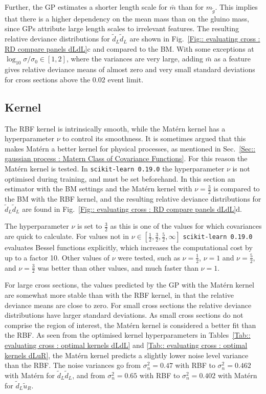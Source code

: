 \documentclass[twoside,english]{uiofysmaster}
\begin{document}
{{Further, the GP estimates a shorter length scale for $\bar{m}$ than for $m_{\widetilde{g}}$. This implies that there is a higher dependency on the mean mass than on the gluino mass, since GPs attribute large length scales to irrelevant features. The resulting relative deviance distributions for $\widetilde{d}_L \widetilde{d}_L$ are shown in Fig.~\ref{Fig:: evaluating cross : RD compare panels dLdL}c and compared to the BM. With some exceptions at $\log_{10} \sigma/\sigma_0 \in [1,2]$, where the variances are very large, adding $\bar{m}$ as a feature gives relative deviance means of almost zero and very small standard deviations for cross sections above the $0.02$ event limit. 

\subsection{Kernel}

The RBF kernel is intrinsically smooth, while the Mat\'{e}rn kernel has a hyperparameter $\nu$ to control its smoothness. It is sometimes argued that this makes Mat\'{e}rn a better kernel for physical processes, as mentioned in Sec.~\ref{Sec:: gaussian process : Matern Class of Covariance Functions}. For this reason the Mat\'{e}rn kernel is tested. In \verb|scikit-learn 0.19.0| the hyperparameter $\nu$ is not optimised during training, and must be set beforehand. In this section an estimator with the BM settings and the Mat\'{e}rn kernel with $\nu=\frac{3}{2}$ is compared to the BM with the RBF kernel, and the resulting relative deviance distributions for $\widetilde{d}_L \widetilde{d}_L$ are found in Fig.~\ref{Fig:: evaluating cross : RD compare panels dLdL}d. 

The hyperparameter $\nu$ is set to $\frac{3}{2}$ as this is one of the values for which covariances are quick to calculate. For values not in $\nu \in [\frac{1}{2}, \frac{3}{2}, \frac{5}{2}, \infty]$ \verb|scikit-learn 0.19.0| evaluates Bessel functions explicitly, which increases the computational cost by up to a factor 10. Other values of $\nu$ were tested, such as $\nu = \frac{1}{2}$, $\nu = 1$ and $\nu = \frac{5}{2}$, and $\nu = \frac{3}{2}$ was better than other values, and much faster than $\nu = 1$.

For large cross sections, the values predicted by the GP with the Mat\'{e}rn kernel are somewhat more stable than with the RBF kernel, in that the relative deviance means are close to zero. For small cross sections the relative deviance distributions have larger standard deviations. As small cross sections do not comprise the region of interest, the Mat\'{e}rn kernel is considered a better fit than the RBF. As seen from the optimised kernel hyperparameters in Tables~\ref{Tab:: evaluating cross : optimal kernels dLdL} and \ref{Tab:: evaluating cross : optimal kernels dLuR}, the Mat\'{e}rn kernel predicts a slightly lower noise level variance than the RBF. The noise variances go from $\sigma_n^2 = 0.47$ with RBF to $\sigma_n^2 = 0.462$ with Mat\'{e}rn for $\widetilde{d}_L \widetilde{d}_L$, and from $\sigma_n^2 = 0.65$ with RBF to $\sigma_n^2 = 0.402$ with Mat\'{e}rn for $\widetilde{d}_L \widetilde{u}_R$. 


}}
\end{document}

